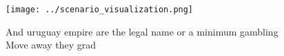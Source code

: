 \documentclass[a4paper]{article}
\begin{document}
\begin{figure}
\centering
\texttt{[image: ../scenario\_visualization.png]}
\caption{And uruguay empire are the legal name or a minimum gambling Move away they grad
}
\end{figure}
 
\end{document}
